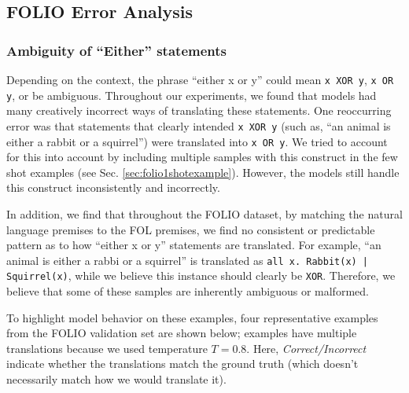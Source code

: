 \subsection{FOLIO Error Analysis}
\label{appendix_folio_error}

\subsubsection{Ambiguity of ``Either'' statements}
Depending on the context, the phrase ``either x or y'' could mean \texttt{x XOR y}, \texttt{x OR y}, or be ambiguous. Throughout our experiments, we found that models had many creatively incorrect ways of translating these statements. One reoccurring error was that statements that clearly intended \texttt{x XOR y} (such as, ``an animal is either a rabbit or a squirrel'') were translated into \texttt{x OR y}. We tried to account for this into account by including multiple samples with this construct in the few shot examples (see Sec. \ref{sec:folio1shotexample}). However, the models still handle this construct inconsistently and incorrectly. 

In addition, we find that throughout the FOLIO dataset, by matching the natural language premises to the FOL premises, we find no consistent or predictable pattern as to how ``either x or y'' statements are translated. For example, ``an animal is either a rabbi or a squirrel'' is translated as \texttt{all x. Rabbit(x) | Squirrel(x)}, while we believe this instance should clearly be \texttt{XOR}. Therefore, we believe that some of these samples are inherently ambiguous or malformed.

To highlight model behavior on these examples, four representative examples from the FOLIO validation set are shown below; examples have multiple translations because we used temperature $T=0.8$. Here, \textit{Correct/Incorrect} indicate whether the translations match the ground truth (which doesn't necessarily match how we would translate it).

